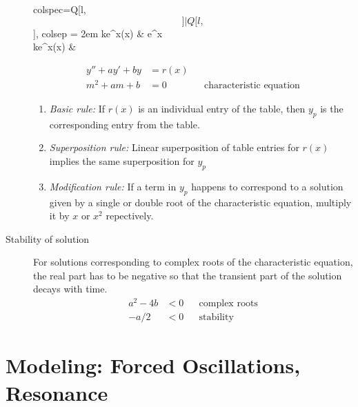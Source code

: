 \begin{description}
\begin{table}[ht]
\begin{tblr}{colspec={Q[l,$$]|Q[l,$$]}, colsep = 2em}
                ke^{\alpha x}\cos(\omega x)   &  e^{\alpha x} \\
                ke^{\alpha x}\sin(\omega x)   &                                                                               \\ \hline
            \end{tblr}
        \end{table}
        \begin{align}
            y'' + ay' + by & = r(x)                                     \\
            m^{2} + am + b & = 0    &  & \text{characteristic equation}
        \end{align}
        \begin{enumerate}
            \item \emph{Basic rule: } If $ r(x) $ is an individual entry of the table, then $ y_{p} $ is the
                  corresponding entry from the table.
            \item \emph{Superposition rule: } Linear superposition of table entries for $ r(x) $ implies the same
                  superposition for $ y_{p} $
            \item \emph{Modification rule: } If a term in $ y_{p} $ happens to correspond to a solution given by a
                  single or double root of the characteristic equation, multiply it by
                  $ x $ or $ x^{2} $ repectively.
        \end{enumerate}
    \item[Stability of solution] For solutions corresponding to complex roots of the
        characteristic equation, the real part has to be negative so that the transient part
        of the solution decays with time.
        \begin{align}
            a^{2}-4b & <0  &  & \text{complex roots} \\
            -a/2     & < 0 &  & \text{stability}
        \end{align}
\end{description}


\section{Modeling: Forced Oscillations, Resonance}

